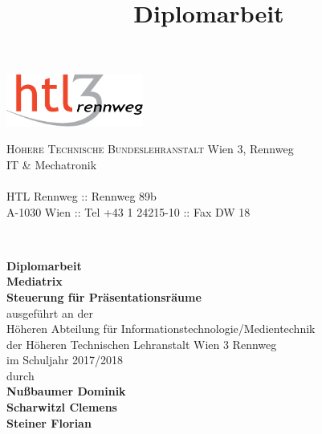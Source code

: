 \documentclass[
    headings=optiontotocandhead,%
    oneside,
    numbers=noenddot,%
    toc=flat, %
    12pt, %
    titlepage, %
    parskip=full, %
    listof=totoc, %
    listof=flat, %
    numbers=noenddot, %
    bibliography=totoc, %
    a4paper,DIV=14,
    BCOR=15mm,
]{scrbook}
\begin{document}
\newcommand{\kapitelautor}{}


\frontmatter %
\title{Diplomarbeit}
\begin{titlepage}
\begin{minipage}[b]{1\columnwidth}
\parbox[b]{50mm}{\includegraphics[width=45mm]{HTL3RLogoRGB}}
\hfill
\parbox[b]{130mm}{\footnotesize \textsc{Höhere Technische Bundeslehranstalt} Wien 3, Rennweg\\
IT \& Mechatronik\\
\\
HTL Rennweg :: Rennweg 89b\\
A-1030 Wien :: Tel +43 1 24215-10 :: Fax DW 18
}\\
\mbox{}
\end{minipage}

\vspace{1cm}


\begin{center}
\textbf{\LARGE{Diplomarbeit}}{\large{}}\\
{\large{}\vspace{15mm}
 }\textbf{\large{Mediatrix}}\\
\textbf{\large{Steuerung für Präsentationsräume}}\\
 \vspace{15mm}
 ausgeführt an der\\
 Höheren Abteilung für Informationstechnologie/Medientechnik\\
 der Höheren Technischen Lehranstalt Wien 3 Rennweg\\
 \vspace{1cm}
 im Schuljahr 2017/2018\\
 \vspace{1cm}
 durch\\
 \vspace{0.5cm}
\textbf{\large{}Nußbaumer Dominik}\\
\textbf{\large{}Scharwitzl Clemens}\\
\textbf{\large{}Steiner Florian}\\


\end{center}
\end{titlepage}
\end{document}
